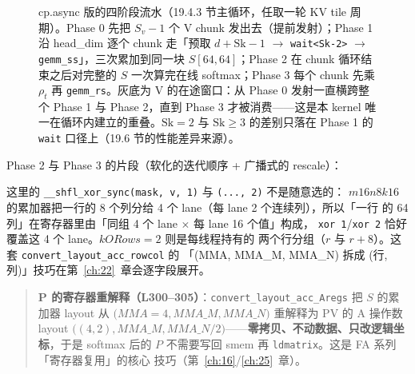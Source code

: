 \begin{figure}[H]
\caption{cp.async 版的四阶段流水（19.4.3 节主循环，任取一轮 KV tile 周期）。Phase 0 先把 $S_v{-}1$ 个 V chunk 发出去（提前发射）；Phase 1 沿 head\_dim 逐个 chunk 走「预取 $d{+}\mathrm{Sk}{-}1$ $\to$ \texttt{wait<Sk-2>} $\to$ \texttt{gemm\_ss}」，三次累加到同一块 $S[64,64]$；Phase 2 在 chunk 循环结束之后对完整的 $S$ 一次算完在线 softmax；Phase 3 每个 chunk 先乘 $\rho_t$ 再 \texttt{gemm\_rs}。灰底为 V 的在途窗口：从 Phase 0 发射一直横跨整个 Phase 1 与 Phase 2，直到 Phase 3 才被消费——这是本 kernel 唯一在循环内建立的重叠。$\mathrm{Sk}{=}2$ 与 $\mathrm{Sk}{\ge}3$ 的差别只落在 Phase 1 的 \texttt{wait} 口径上（19.6 节的性能差异来源）。}
\label{fig:19-four-phase}
\end{figure}

Phase 2 与 Phase 3 的片段（软化的迭代顺序 + 广播式的 rescale）：



这里的 \texttt{\_\allowbreak{}\_\allowbreak{}shfl\_\allowbreak{}xor\_\allowbreak{}sync\allowbreak{}(mask,\allowbreak{} v,\allowbreak{} 1)} 与 \texttt{(..., 2)} 不是随意选的：
$m16n8k16$ 的累加器把一行的 8 个列分给 4 个 lane（每 lane 2 个连续列），所以「一行
的 64 列」在寄存器里由「同组 4 个 lane $\times$ 每 lane 16 个值」构成，
\texttt{xor 1}/\texttt{xor 2} 恰好覆盖这 4 个 lane。$kORows = 2$ 则是每线程持有的
两个行分组（$r$ 与 $r+8$）。这套 \texttt{convert\_\allowbreak{}layout\_\allowbreak{}}\allowbreak\texttt{acc\_rowcol} 的
「(MMA, MMA\_M, MMA\_N) 拆成 (行, 列)」技巧在第~\ref{ch:22}~章会逐字段展开。

\begin{quote}\small
\textbf{P 的寄存器重解释（L300--305）}：\texttt{convert\_\allowbreak{}layout\_\allowbreak{}}\allowbreak\texttt{acc\_Aregs} 把
$S$ 的累加器 layout 从 $(MMA{=}4,$\allowbreak$ MMA\_M,$\allowbreak$ MMA\_N)$ 重解释为 PV 的 A 操作数 layout
$((4,2),$\allowbreak$ MMA\_M,$\allowbreak$ MMA\_N/2)$——\textbf{零拷贝、不动数据、只改逻辑坐标}，于是 softmax
后的 $P$ 不需要写回 smem 再 \texttt{ldmatrix}。这是 FA 系列「寄存器复用」的核心
技巧（第~\ref{ch:16}/\ref{ch:25}~章）。
\end{quote}

